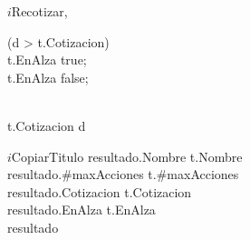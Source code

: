 	\begin{algorithm}{$i$Recotizar}{, }{}
		\begin{IF}{(d > t.Cotizacion)}		\\
		t.EnAlza \leftarrow true;
		\ELSE \\
		t.EnAlza \leftarrow false;
		\end{IF} \\
		t.Cotizacion \leftarrow d \\
	\end{algorithm}	
	

	\begin{algorithm}{$i$CopiarTitulo}{}{}
		resultado.Nombre \leftarrow t.Nombre \\
		resultado.\#maxAcciones \leftarrow t.\#maxAcciones \\
		resultado.Cotizacion \leftarrow t.Cotizacion \\
		resultado.EnAlza \leftarrow t.EnAlza \\
		\RETURN resultado
	\end{algorithm}

\newpage